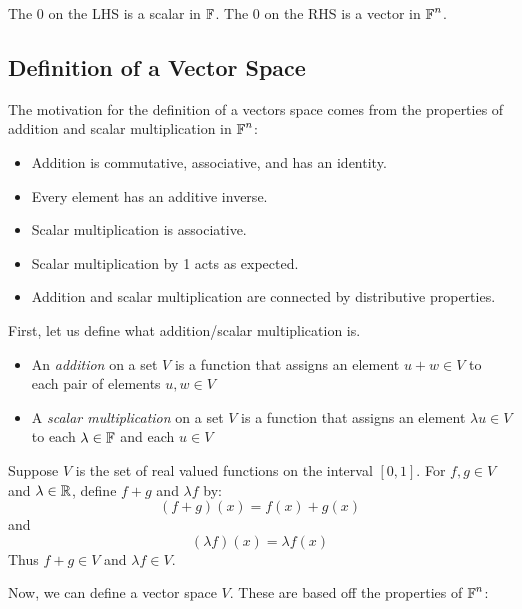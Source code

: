 The 0 on the LHS is a scalar in $\operatorname{\mathbb{F}}$. The 0 on the RHS is a vector in $\operatorname{\mathbb{F}}^n$.

\subsection{Definition of a Vector Space}

The motivation for the definition of a vectors space comes from the
properties of addition and scalar multiplication in $\operatorname{\mathbb{F}}^n$:
\begin{itemize}
    \item Addition is commutative, associative, and has an identity.
    \item Every element has an additive inverse.
    \item Scalar multiplication is associative.
    \item Scalar multiplication by 1 acts as expected.
    \item Addition and scalar multiplication are connected by distributive properties.
\end{itemize}

First, let us define what addition/scalar multiplication is.
\begin{definition}
    \begin{itemize}
        \item An \textit{addition} on a set $V$ is a function that assigns an element $u + w \in V$ to each pair of elements $u, w \in V$
        \item A \textit{scalar multiplication} on a set $V$ is a function that assigns an element $\lambda u \in V$ to each $\lambda \in \operatorname{\mathbb{F}}$ and each $u \in V$
    \end{itemize}
\end{definition}

\begin{example}
    Suppose $V$ is the set of real valued functions on the interval $[0, 1]$.
    For $f, g \in V$ and $\lambda \in \operatorname{\mathbb{R}}$, define $f + g$ and $\lambda f$ by:
    \[ (f+g)(x) = f(x) + g(x) \]
    and
    \[ (\lambda f)(x) = \lambda f(x) \]
    Thus $f + g \in V$ and $\lambda f \in V$.
\end{example}

Now, we can define a vector space $V$. These are based off the
properties of $\operatorname{\mathbb{F}}^n$:

